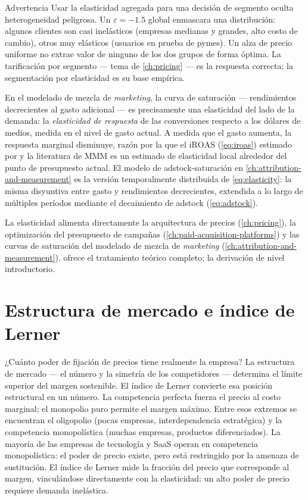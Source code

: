 \begin{admonition}{Advertencia}
Usar la elasticidad agregada para una decisión de segmento oculta heterogeneidad peligrosa. Un
\(\varepsilon=-1.5\) global enmascara una distribución: algunos clientes son casi inelásticos
(empresas medianas y grandes, alto costo de cambio), otros muy elásticos (usuarios en prueba de
pymes). Un alza de precio uniforme no extrae valor de ninguno de los dos grupos de forma óptima.
La tarificación por segmento --- tema de \cref{ch:pricing} --- es la respuesta correcta; la
segmentación por elasticidad es su base empírica.
\end{admonition}

En el modelado de mezcla de \emph{marketing}, la curva de saturación --- rendimientos decrecientes
al gasto adicional --- es precisamente una elasticidad del lado de la demanda: la \emph{elasticidad
de respuesta} de las conversiones respecto a los dólares de medios, medida en el nivel de gasto
actual. A medida que el gasto aumenta, la respuesta marginal disminuye, razón por la que el
\(\mathrm{iROAS}\) (\cref{eq:iroas}) estimado por \textcite{hanssens2001marketing} y la
literatura de MMM es un estimado de elasticidad local alrededor del punto de presupuesto actual.
El modelo de adstock-saturación en \cref{ch:attribution-and-measurement} es la versión
temporalmente distribuida de \cref{eq:elasticity}: la misma disyuntiva entre gasto y rendimientos
decrecientes, extendida a lo largo de múltiples períodos mediante el decaimiento de adstock
(\cref{eq:adstock}).

La elasticidad alimenta directamente la arquitectura de precios (\cref{ch:pricing}), la
optimización del presupuesto de campañas (\cref{ch:paid-acquisition-platforms}) y las curvas de
saturación del modelado de mezcla de \emph{marketing} (\cref{ch:attribution-and-measurement}).
\textcite{pindyck2017} ofrece el tratamiento teórico completo; \textcite{mankiw2020} la
derivación de nivel introductorio.

\section{Estructura de mercado e índice de Lerner}\label{sec:lerner}

¿Cuánto poder de fijación de precios tiene realmente la empresa? La estructura de mercado ---
el número y la simetría de los competidores --- determina el límite superior del margen sostenible.
El índice de Lerner convierte esa posición estructural en un número. La competencia perfecta fuerza
el precio al costo marginal; el monopolio puro permite el margen máximo. Entre esos extremos se
encuentran el oligopolio (pocas empresas, interdependencia estratégica) y la competencia
monopolística (muchas empresas, productos diferenciados). La mayoría de las empresas de tecnología
y SaaS operan en competencia monopolística: el poder de precio existe, pero está restringido por la
amenaza de sustitución. El índice de Lerner mide la fracción del precio que corresponde al margen,
vinculándose directamente con la elasticidad: un alto poder de precio requiere demanda inelástica.

